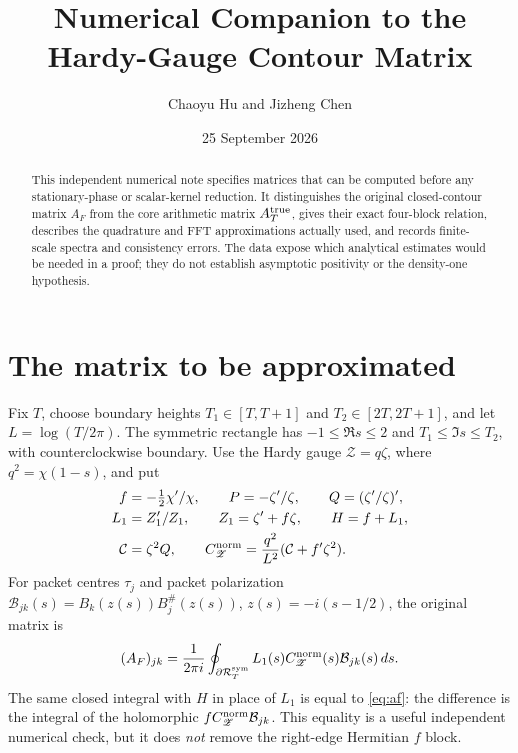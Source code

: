 \documentclass[11pt]{article}
\title{Numerical Companion to the Hardy-Gauge Contour Matrix}
\author{Chaoyu Hu and Jizheng Chen}
\date{25 September 2026}
\newcommand{\CC}{\mathcal C}
\newcommand{\BF}{\mathcal B}
\newcommand{\ZZ}{\mathscr Z}
\begin{document}
\maketitle

\begin{abstract}
This independent numerical note specifies matrices that can be computed before
any stationary-phase or scalar-kernel reduction. It distinguishes the original
closed-contour matrix $A_F$ from the core arithmetic matrix $A_T^{\rm true}$,
gives their exact four-block relation, describes the quadrature and FFT
approximations actually used, and records finite-scale spectra and consistency
errors. The data expose which analytical estimates would be needed in a proof;
they do not establish asymptotic positivity or the density-one hypothesis.
\end{abstract}

\section{The matrix to be approximated}

Fix $T$, choose boundary heights $T_1\in[T,T+1]$ and
$T_2\in[2T,2T+1]$, and let $L=\log(T/2\pi)$. The symmetric rectangle has
$-1\le\Re s\le2$ and $T_1\le\Im s\le T_2$, with counterclockwise boundary.
Use the Hardy gauge $\ZZ=q\zeta$, where $q^2=\chi(1-s)$, and put
\begin{equation}
\begin{split}
f&=-\tfrac12\chi'/\chi,\qquad
P=-\zeta'/\zeta,\qquad Q=(\zeta'/\zeta)',\\
L_1&=Z_1'/Z_1,\qquad Z_1=\zeta'+f\zeta,\qquad H=f+L_1,\\
\CC&=\zeta^2Q,\qquad
C_{\ZZ}^{\rm norm}=\frac{q^2}{L^2}(\CC+f'\zeta^2).
\end{split}
\label{eq:fields}
\end{equation}
For packet centres $\tau_j$ and packet polarization
$\BF_{j k}(s)=B_k(z(s))B_j^\#(z(s))$, $z(s)=-i(s-1/2)$, the original matrix is
\begin{equation}
(A_F)_{jk}=\frac{1}{2\pi i}\oint_{\partial\mathcal R_T^{\rm sym}}
L_1(s)C_{\ZZ}^{\rm norm}(s)\BF_{jk}(s)\,ds.
\label{eq:af}
\end{equation}
The same closed integral with $H$ in place of $L_1$ is equal to
\eqref{eq:af}: the difference is the integral of the holomorphic
$fC_{\ZZ}^{\rm norm}\BF_{jk}$. This equality is a useful independent
numerical check, but it does \emph{not} remove the right-edge Hermitian
$f$ block.
\end{document}
